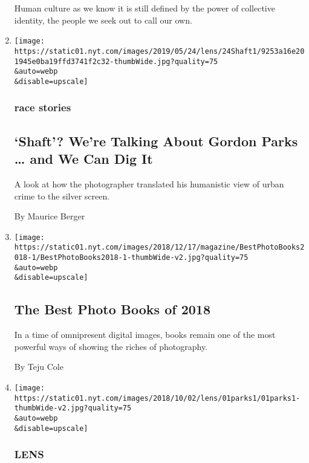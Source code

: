 \begin{enumerate}
  Human culture as we know it is still defined by the power of
  collective identity, the people we seek out to call our own.
\item
  \href{/2019/05/24/lens/shaft-gordon-parks-photos.html}{}

  \texttt{[image: https://static01.nyt.com/images/2019/05/24/lens/24Shaft1/9253a16e201945e0ba19ffd3741f2c32-thumbWide.jpg?quality=75\\\&auto=webp\\\&disable=upscale]}

  \hypertarget{race-stories}{%
  \subsubsection{race stories}\label{race-stories}}

  \hypertarget{shaft-were-talking-about-gordon-parks--and-we-can-dig-it}{%
  \subsection{`Shaft'? We're Talking About Gordon Parks \ldots{} and We
  Can Dig
  It}\label{shaft-were-talking-about-gordon-parks--and-we-can-dig-it}}

  A look at how the photographer translated his humanistic view of urban
  crime to the silver screen.

  By Maurice Berger
\item
  \href{/2018/12/18/magazine/best-photo-books-2018.html}{}

  \texttt{[image: https://static01.nyt.com/images/2018/12/17/magazine/BestPhotoBooks2018-1/BestPhotoBooks2018-1-thumbWide-v2.jpg?quality=75\\\&auto=webp\\\&disable=upscale]}

  \hypertarget{the-best-photo-books-of-2018}{%
  \subsection{The Best Photo Books of
  2018}\label{the-best-photo-books-of-2018}}

  In a time of omnipresent digital images, books remain one of the most
  powerful ways of showing the riches of photography.

  By Teju Cole
\item
  \href{/2018/10/01/lens/gordon-parks-early-years.html}{}

  \texttt{[image: https://static01.nyt.com/images/2018/10/02/lens/01parks1/01parks1-thumbWide-v2.jpg?quality=75\\\&auto=webp\\\&disable=upscale]}

  \hypertarget{lens}{%
  \subsubsection{LENS}\label{lens}}


\end{enumerate}
